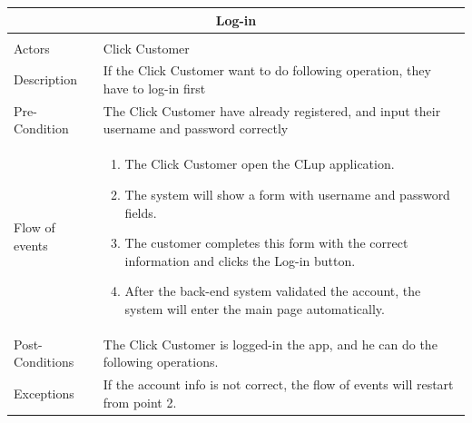 \documentclass[a4paper,12pt]{report}
\begin{document}
\begin{center}
	\begin{tabular}{p{}|p{}}
		\multicolumn{2}{c}{\large \textbf{Log-in}} \\[3mm] 
		\hline \\
		Actors &  Click Customer \\[3mm] 
		Description &  If the Click Customer want to do following operation, they have to log-in first  \\[3mm]  
		Pre-Condition &  The Click Customer have already registered, and input their username and password correctly \\[3mm] 
		Flow of events & 
		\begin{enumerate}
			\item The Click Customer open the CLup application.
			\item The system will show a form with username and password fields.
			\item The customer completes this form with the correct information and clicks the Log-in button.
			\item After the back-end system validated the account, the system will enter the main page automatically.
		\end{enumerate}
		\\[3mm] 
		Post-Conditions & The Click Customer is logged-in the app, and he can do the following operations.\\[3mm] 
		Exceptions & If the account info is not correct, the flow of events will restart from point 2.\\[3mm] 
	\end{tabular}
\end{center}
\end{document}
